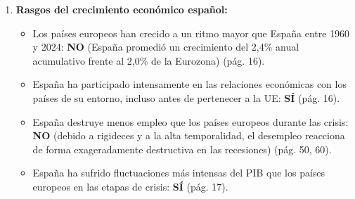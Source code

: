 \begin{enumerate}[label=\arabic*.]
    \item \textbf{Rasgos del crecimiento económico español:}
    \begin{itemize}
        \item Los países europeos han crecido a un ritmo mayor que España entre 1960 y 2024: \textbf{NO} (España promedió un crecimiento del 2,4\% anual acumulativo frente al 2,0\% de la Eurozona) (pág. 16).
        \item España ha participado intensamente en las relaciones económicas con los países de su entorno, incluso antes de pertenecer a la UE: \textbf{SÍ} (pág. 16).
        \item España destruye menos empleo que los países europeos durante las crisis: \textbf{NO} (debido a rigideces y a la alta temporalidad, el desempleo reacciona de forma exageradamente destructiva en las recesiones) (pág. 50, 60).
        \item España ha sufrido fluctuaciones más intensas del PIB que los países europeos en las etapas de crisis: \textbf{SÍ} (pág. 17).
    \end{itemize}


\end{enumerate}
